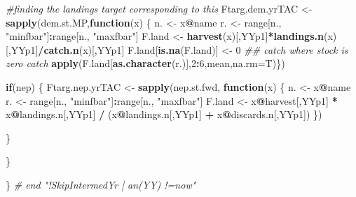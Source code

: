 \documentclass[
]{article}
\newenvironment{Shaded}{\begin{snugshade}}{\end{snugshade}}
\newcommand{\CommentTok}[1]{\textcolor[rgb]{0.56,0.35,0.01}{\textit{#1}}}
\newcommand{\ControlFlowTok}[1]{\textcolor[rgb]{0.13,0.29,0.53}{\textbf{#1}}}
\newcommand{\DataTypeTok}[1]{\textcolor[rgb]{0.13,0.29,0.53}{#1}}
\newcommand{\DecValTok}[1]{\textcolor[rgb]{0.00,0.00,0.81}{#1}}
\newcommand{\KeywordTok}[1]{\textcolor[rgb]{0.13,0.29,0.53}{\textbf{#1}}}
\newcommand{\NormalTok}[1]{#1}
\newcommand{\OperatorTok}[1]{\textcolor[rgb]{0.81,0.36,0.00}{\textbf{#1}}}
\newcommand{\StringTok}[1]{\textcolor[rgb]{0.31,0.60,0.02}{#1}}
\begin{document}
\begin{Shaded}
\begin{Highlighting}[]
{{{{{                \CommentTok{#finding the landings target corresponding to this}
\NormalTok{                Ftarg.dem.yrTAC <-}\StringTok{ }\KeywordTok{sapply}\NormalTok{(dem.st.MP,}\ControlFlowTok{function}\NormalTok{(x) \{}
\NormalTok{                                      n. <-}\StringTok{ }\NormalTok{x}\OperatorTok{@}\NormalTok{name}
\NormalTok{                                      r. <-}\StringTok{ }\NormalTok{range[n., }\StringTok{"minfbar"}\NormalTok{]}\OperatorTok{:}\NormalTok{range[n., }\StringTok{"maxfbar"}\NormalTok{]}
\NormalTok{                                      F.land <-}\StringTok{ }\KeywordTok{harvest}\NormalTok{(x)[,YYp1]}\OperatorTok{*}\KeywordTok{landings.n}\NormalTok{(x)[,YYp1]}\OperatorTok{/}\KeywordTok{catch.n}\NormalTok{(x)[,YYp1]}
\NormalTok{                                      F.land[}\KeywordTok{is.na}\NormalTok{(F.land)] <-}\StringTok{ }\DecValTok{0} \CommentTok{## catch where stock is zero catch}
                                      \KeywordTok{apply}\NormalTok{(F.land[}\KeywordTok{as.character}\NormalTok{(r.)],}\DecValTok{2}\OperatorTok{:}\DecValTok{6}\NormalTok{,mean,}\DataTypeTok{na.rm=}\NormalTok{T)\})}

        \ControlFlowTok{if}\NormalTok{(nep) \{}
\NormalTok{        Ftarg.nep.yrTAC <-}\StringTok{ }\KeywordTok{sapply}\NormalTok{(nep.st.fwd, }\ControlFlowTok{function}\NormalTok{(x) \{}
\NormalTok{                      n. <-}\StringTok{ }\NormalTok{x}\OperatorTok{@}\NormalTok{name}
\NormalTok{                      r. <-}\StringTok{ }\NormalTok{range[n., }\StringTok{"minfbar"}\NormalTok{]}\OperatorTok{:}\NormalTok{range[n., }\StringTok{"maxfbar"}\NormalTok{]}
\NormalTok{                      F.land <-}\StringTok{ }\NormalTok{x}\OperatorTok{@}\NormalTok{harvest[,YYp1] }\OperatorTok{*}\StringTok{ }\NormalTok{x}\OperatorTok{@}\NormalTok{landings.n[,YYp1] }\OperatorTok{/}\StringTok{ }\NormalTok{(x}\OperatorTok{@}\NormalTok{landings.n[,YYp1] }\OperatorTok{+}\StringTok{ }\NormalTok{x}\OperatorTok{@}\NormalTok{discards.n[,YYp1])}
\NormalTok{                      \})}

\NormalTok{        \}}
        
\NormalTok{        \}}
    
\NormalTok{        \} }\CommentTok{# end "!SkipIntermedYr | an(YY) !=now"}

}}}}}
\end{Highlighting}
\end{Shaded}
\end{document}
